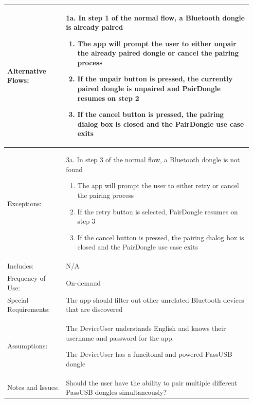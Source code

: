 \documentclass[stu]{apa7}
\newcommand{\nextitem}{\par\hspace*{\labelsep}\textbullet\hspace*{\labelsep}}
\newcommand{\nextitemblank}{\par\hspace*{\labelsep}\hspace*{\labelsep}}
\begin{document}
{\begin{xltabular}{\textwidth}{|l|X|}
  Alternative Flows: & 1a. In step 1 of the normal flow, a Bluetooth dongle is already paired 
    \begin{enumerate}
      \item The app will prompt the user to either unpair the already paired dongle or cancel the pairing process
      \item If the unpair button is pressed, the currently paired dongle is unpaired and PairDongle resumes on step 2
      \item If the cancel button is pressed, the pairing dialog box is closed and the PairDongle use case exits
    \end{enumerate} \\ \hline
  Exceptions: & \nextitemblank 3a. In step 3 of the normal flow, a Bluetooth dongle is not found  
    \begin{enumerate}
      \item The app will prompt the user to either retry or cancel the pairing process 
      \item If the retry button is selected, PairDongle resumes on step 3 
      \item If the cancel button is pressed, the pairing dialog box is closed and the PairDongle use case exits
    \end{enumerate} \\ \hline

  Includes: & N/A \\ \hline

  Frequency of Use: & On-demand \\ \hline

  Special Requirements: & \nextitem The app should filter out other unrelated Bluetooth devices that are discovered \\ \hline

  Assumptions: & \nextitem The DeviceUser understands English and knows their username and password for the app. \nextitem The DeviceUser has a funcitonal and powered PassUSB dongle \\ \hline

  Notes and Issues: & \nextitem Should the user have the ability to pair multiple different PassUSB dongles simultaneously? \\ \hline

\end{xltabular}}

\pagebreak
\end{document}
